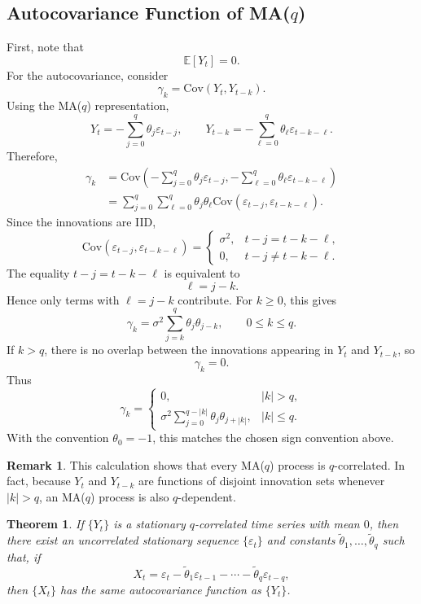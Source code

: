 \documentclass[12pt,oneside]{book}
\numberwithin{equation}{section}
\theoremstyle{definition}
\newtheorem{remark}{Remark}[section]
\theoremstyle{plain}
\newtheorem{theorem}{Theorem}[section]
\theoremstyle{remark}
\newcommand{\E}{\mathbb{E}}
\newcommand{\Cov}{\mathrm{Cov}}
\begin{document}
\subsection*{Autocovariance Function of MA($q$)}

First, note that
\[
\E[Y_t]=0.
\]
For the autocovariance, consider
\[
\gamma_k
=
\Cov(Y_t,Y_{t-k}).
\]
Using the MA($q$) representation,
\[
Y_t
=
-\sum_{j=0}^{q}\theta_j\varepsilon_{t-j},
\qquad
Y_{t-k}
=
-\sum_{\ell=0}^{q}\theta_\ell\varepsilon_{t-k-\ell}.
\]
Therefore,
\begin{align*}
\gamma_k
&=
\Cov\left(
-\sum_{j=0}^{q}\theta_j\varepsilon_{t-j},
-\sum_{\ell=0}^{q}\theta_\ell\varepsilon_{t-k-\ell}
\right) \\
&=
\sum_{j=0}^{q}\sum_{\ell=0}^{q}
\theta_j\theta_\ell
\Cov(\varepsilon_{t-j},\varepsilon_{t-k-\ell}).
\end{align*}
Since the innovations are IID,
\[
\Cov(\varepsilon_{t-j},\varepsilon_{t-k-\ell})
=
\begin{cases}
\sigma^2, & t-j=t-k-\ell,\\
0, & t-j\neq t-k-\ell.
\end{cases}
\]
The equality $t-j=t-k-\ell$ is equivalent to
\[
\ell=j-k.
\]
Hence only terms with $\ell=j-k$ contribute. For $k\geq 0$, this gives
\[
\gamma_k
=
\sigma^2
\sum_{j=k}^{q}\theta_j\theta_{j-k},
\qquad
0\leq k\leq q.
\]
If $k>q$, there is no overlap between the innovations appearing in $Y_t$ and $Y_{t-k}$, so
\[
\gamma_k=0.
\]
Thus
\[
\gamma_k
=
\begin{cases}
0, & |k|>q,\\
\sigma^2\sum_{j=0}^{q-|k|}\theta_j\theta_{j+|k|}, & |k|\leq q.
\end{cases}
\]
With the convention $\theta_0=-1$, this matches the chosen sign convention above.

\begin{remark}
This calculation shows that every MA($q$) process is $q$-correlated. In fact, because $Y_t$ and $Y_{t-k}$ are functions of disjoint innovation sets whenever $|k|>q$, an MA($q$) process is also $q$-dependent.
\end{remark}

\begin{theorem}
If $\{Y_t\}$ is a stationary $q$-correlated time series with mean $0$, then there exist an uncorrelated stationary sequence $\{\varepsilon_t\}$ and constants $\tilde{\theta}_1,\ldots,\tilde{\theta}_q$ such that, if
\[
X_t
=
\varepsilon_t-\tilde{\theta}_1\varepsilon_{t-1}
-\cdots
-\tilde{\theta}_q\varepsilon_{t-q},
\]
then $\{X_t\}$ has the same autocovariance function as $\{Y_t\}$.
\end{theorem}
\end{document}
